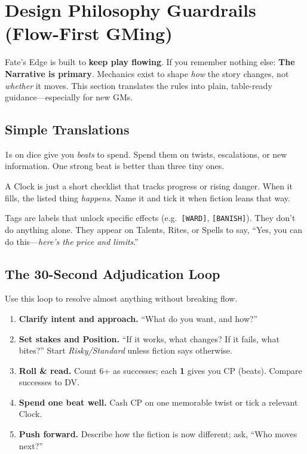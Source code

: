 

\section{Design Philosophy Guardrails (Flow-First GMing)}
\label{sec:design-guardrails}

Fate’s Edge is built to \textbf{keep play flowing}. If you remember nothing else: \textbf{The Narrative is primary}. 
Mechanics exist to shape \emph{how} the story changes, not \emph{whether} it moves. 
This section translates the rules into plain, table-ready guidance—especially for new GMs.

\subsection{Simple Translations}
\begin{description}[leftmargin=1.5em, style=nextline]
  \item[Complication Points (CP) $\Rightarrow$ Story Beats:] 1s on dice give you \emph{beats} to spend. Spend them on twists, escalations, or new information. One strong beat is better than three tiny ones.
  \item[Clocks $\Rightarrow$ Checkboxes/Lists:] A Clock is just a short checklist that tracks progress or rising danger. When it fills, the listed thing \emph{happens}. Name it and tick it when fiction leans that way.
  \item[\texttt{[TAGS]} $\Rightarrow$ Gates with a Cost:] Tags are labels that unlock specific effects (e.g.\ \texttt{[WARD]}, \texttt{[BANISH]}). They don’t do anything alone. They appear on Talents, Rites, or Spells to say, ``Yes, you can do this—\emph{here’s the price and limits}.''
\end{description}

\subsection{The 30-Second Adjudication Loop}
Use this loop to resolve almost anything without breaking flow.
\begin{enumerate}
  \item \textbf{Clarify intent and approach.} ``What do you want, and how?''
  \item \textbf{Set stakes and Position.} ``If it works, what changes? If it fails, what bites?'' Start \emph{Risky/Standard} unless fiction says otherwise.
  \item \textbf{Roll \& read.} Count 6+ as successes; each \textbf{1} gives you CP (beats). Compare successes to DV.
  \item \textbf{Spend one beat well.} Cash CP on one memorable twist or tick a relevant Clock.
  \item \textbf{Push forward.} Describe how the fiction is now different; ask, ``Who moves next?''
\end{enumerate}

